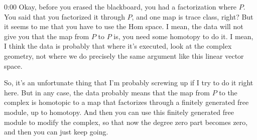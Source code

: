 \begin{unfinished}{0:00}
Okay, before you erased the blackboard, you had a factorization where $P$. You said that you factorized it through $P$, and one map is trace class, right? But it seems to me that you have to use the $\text{Hom}$ space. I mean, the data will not give you that the map from $P$ to $P$ is, you need some homotopy to do it. I mean, I think the data is probably that where it's executed, look at the complex geometry, not where we do precisely the same argument like this linear vector space.

So, it's an unfortunate thing that I'm probably screwing up if I try to do it right here. But in any case, the data probably means that the map from $P$ to the complex is homotopic to a map that factorizes through a finitely generated free module, up to homotopy. And then you can use this finitely generated free module to modify the complex, so that now the degree zero part becomes zero, and then you can just keep going.

\end{unfinished}